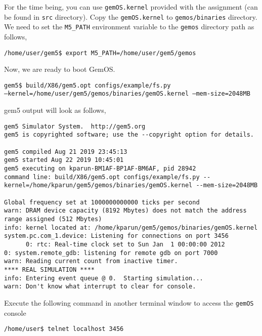 \documentclass[12pt]{article}
\begin{document}
%
For the time being, you can use \texttt{gemOS.kernel} provided with the assignment (can be found in {\tt src} directory). 
Copy the \texttt{gemOS.kernel} to {\tt gemos/binaries} directory.\\
%
We need to set the \texttt{M5\_PATH} environment variable to the \texttt{gemos} directory path as follows,


\vspace{0.25cm}
\noindent
\texttt{/home/user/gem5\$ export M5\_PATH=/home/user/gem5/gemos}
 
\vspace{0.25cm}
\noindent
Now, we are ready to boot GemOS.

\vspace{0.25cm}
\noindent
\texttt{gem5\$ build/X86/gem5.opt configs/example/fs.py} \\ {\tt --kernel=/home/user/gem5/gemos/binaries/gemOS.kernel --mem-size=2048MB}

\vspace{0.25cm}
\noindent
gem5 output will look as follows,
\begin{scriptsize}
\begin{verbatim}
gem5 Simulator System.  http://gem5.org
gem5 is copyrighted software; use the --copyright option for details.

gem5 compiled Aug 21 2019 23:45:13
gem5 started Aug 22 2019 10:45:01
gem5 executing on kparun-BM1AF-BP1AF-BM6AF, pid 28942
command line: build/X86/gem5.opt configs/example/fs.py --kernel=/home/kparun/gem5/gemos/binaries/gemOS.kernel --mem-size=2048MB

Global frequency set at 1000000000000 ticks per second
warn: DRAM device capacity (8192 Mbytes) does not match the address range assigned (512 Mbytes)
info: kernel located at: /home/kparun/gem5/gemos/binaries/gemOS.kernel
system.pc.com_1.device: Listening for connections on port 3456
      0: rtc: Real-time clock set to Sun Jan  1 00:00:00 2012
0: system.remote_gdb: listening for remote gdb on port 7000
warn: Reading current count from inactive timer.
**** REAL SIMULATION ****
info: Entering event queue @ 0.  Starting simulation...
warn: Don't know what interrupt to clear for console.
\end{verbatim} 
\end{scriptsize}
\noindent
Execute the following command in another terminal window to access the \texttt{gemOS} console 

\vspace{0.25cm}
\noindent
\texttt{/home/user\$ telnet localhost 3456}
\end{document}

